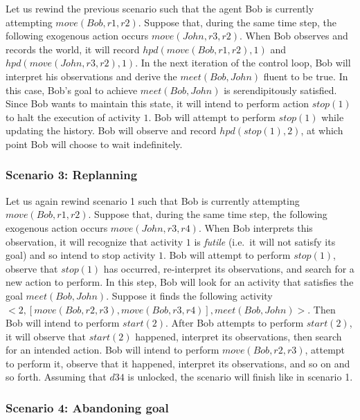 Let us rewind the previous scenario such that the agent Bob is currently attempting $move(Bob, r1, r2)$.
Suppose that, during the same time step, the following exogenous action occurs $move(John, r3, r2)$.
When Bob observes and records the world, it will record $hpd(move(Bob, r1, r2), 1)$ and $hpd(move(John,r3,r2), 1)$.
In the next iteration of the control loop, Bob will interpret his observations and derive the $meet(Bob, John)$ fluent to be true.
In this case, Bob's goal to achieve $meet(Bob, John)$ is serendipitously satisfied.
Since Bob wants to maintain this state, it will intend to perform action $stop(1)$ to halt the execution of activity $1$.
Bob will attempt to perform $stop(1)$ while updating the history.
Bob will observe and record $hpd(stop(1), 2)$, at which point Bob will choose to wait indefinitely.

\subsubsection{Scenario 3: Replanning~\citep{blount_towards_2014}}
\label{subsubsec:aia_scenario_3}

Let us again rewind scenario 1 such that Bob is currently attempting $move(Bob, r1, r2)$.
Suppose that, during the same time step, the following exogenous action occurs $move(John, r3, r4)$.
When Bob interprets this observation, it will recognize that activity $1$ is \textit{futile} (i.e.~it will not satisfy its goal) and so intend to stop activity $1$.
Bob will attempt to perform $stop(1)$, observe that $stop(1)$ has occurred, re-interpret its observations, and search for a new action to perform.
In this step, Bob will look for an activity that satisfies the goal $meet(Bob, John)$.
Suppose it finds the following activity $<2, [move(Bob, r2,r3), move(Bob, r3,r4)],meet(Bob,John)>$.
Then Bob will intend to perform $start(2)$.
After Bob attempts to perform $start(2)$, it will observe that $start(2)$ happened, interpret its observations, then search for an intended action.
Bob will intend to perform $move(Bob, r2,r3)$, attempt to perform it, observe that it happened, interpret its observations, and so on and so forth.
Assuming that $d34$ is unlocked, the scenario will finish like in scenario 1.

\subsubsection{Scenario 4: Abandoning goal~\citep{blount_towards_2014}}
\label{subsubsec:aia_scenario_4}

